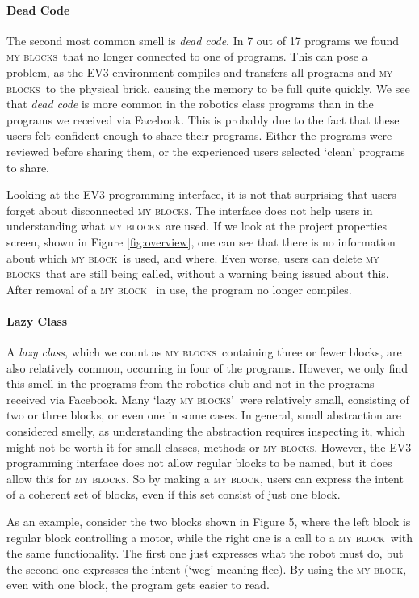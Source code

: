 \documentclass{sig-alternate}
\newcommand{\mbs}{\textsc{my blocks}}
\newcommand{\mb}{\textsc{my block}}
\begin{document}
\paragraph{Dead Code}
The second most common smell is \emph{dead code}. In 7 out of 17 programs we found \mbs~that no longer connected to one of programs. This can pose a problem, as the EV3 environment compiles and transfers all programs and \mbs~to the physical brick, causing the memory to be full quite quickly. We see that \emph{dead code} is more common in the robotics class programs than in the programs we received via Facebook. This is probably due to the fact that these users felt confident enough to share their programs. Either the programs were reviewed before sharing them, or the experienced users selected `clean' programs to share.

Looking at the EV3 programming interface, it is not that surprising that users forget about disconnected \mbs. The interface does not help users in understanding what \mbs~are used. If we look at the project properties screen, shown in Figure \ref{fig:overview}, one can see that there is no information about which \mb~is used, and where. Even worse, users can delete \mbs~that are still being called, without a warning being issued about this. After removal of a \mb~ in use, the program no longer compiles.


\paragraph{Lazy Class}
A \emph{lazy class}, which we count as \mbs~containing three or fewer blocks, are also relatively common, occurring in four of the programs. However, we only find this smell in the programs from the robotics club and not in the programs received via Facebook. Many `lazy \mbs'~were relatively small, consisting of two or three blocks, or even one in some cases. In general, small abstraction are considered smelly, as understanding the abstraction requires inspecting it, which might not be worth it for small classes, methods or \mbs. However, the EV3 programming interface does not allow regular blocks to be named, but it does allow this for \mbs. So by making a \mb, users can express the intent of a coherent set of blocks, even if this set consist of just one block. 

As an example, consider the two blocks shown in Figure 5, where the left block is regular block controlling a motor, while the right one is a call to a \mb~with the same functionality. The first one just expresses what the robot must do, but the second one expresses the intent (`weg' meaning flee). By using the \mb, even with one block, the program gets easier to read.
\end{document}
